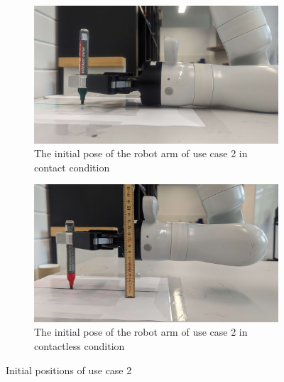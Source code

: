 \documentclass[report.tex]{subfiles}
\begin{document}
    \begin{figure}[H]
    \captionsetup[subfigure]{justification=centering}
    \begin{subfigure}{0.5\textwidth}
            \centering
            \includegraphics[width=\linewidth]{images/us2_contact.jpg}
            \caption{The initial pose of the robot arm of use case 2 in contact condition}
            \label{fig:us2_init_con}
        \end{subfigure}
        \begin{subfigure}{0.5\textwidth}
            \centering
            \includegraphics[width=\linewidth]{images/us2_nocontact.jpg}
            \caption{The initial pose of the robot arm of use case 2 in contactless condition}
            \label{fig:us2_init_nocon}
        \end{subfigure}
        \caption{Initial positions of use case 2}
    \end{figure}
\end{document}
